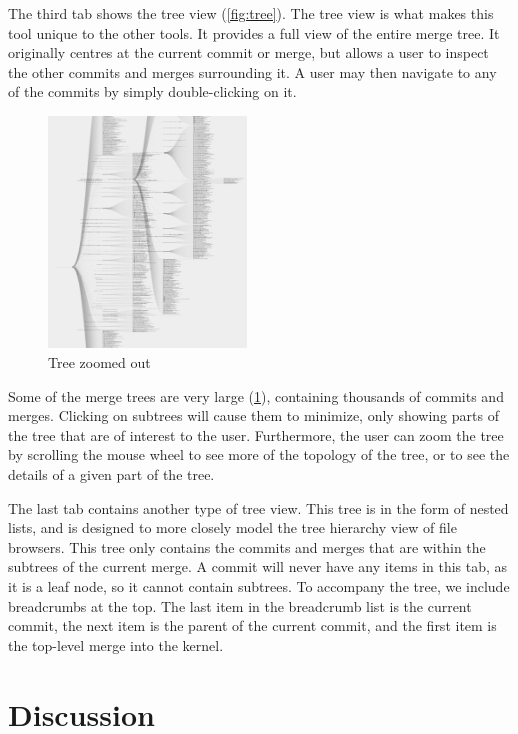 \documentclass[conference, draftclsnofoot]{IEEEtran}
\begin{document}
The third tab shows the tree view (\ref{fig:tree}). The tree view is what makes
this tool unique to the other tools. It provides a full view of the entire
merge tree. It originally centres at the current commit or merge, but allows a
user to inspect the other commits and merges surrounding it. A user may then
navigate to any of the commits by simply double-clicking on it.

\begin{figure}[h]
	\centering
	\includegraphics[width=0.47\textwidth]{figures/tree_zoom.png}
	\caption{Tree zoomed out}
	\label{fig:zoomed_tree}
\end{figure}

Some of the merge trees are very large (\ref{fig:zoomed_tree}), containing
thousands of commits and merges. Clicking on subtrees will cause them to
minimize, only showing parts of the tree that are of interest to the user.
Furthermore, the user can zoom the tree by scrolling the mouse wheel to see
more of the topology of the tree, or to see the details of a given part of the
tree.

The last tab contains another type of tree view. This tree is in the form of
nested lists, and is designed to more closely model the tree hierarchy view of
file browsers. This tree only contains the commits and merges that are within
the subtrees of the current merge. A commit will never have any items in this
tab, as it is a leaf node, so it cannot contain subtrees. To accompany the
tree, we include breadcrumbs at the top. The last item in the breadcrumb list
is the current commit, the next item is the parent of the current commit, and
the first item is the top-level merge into the kernel.



\section{Discussion}
\end{document}
